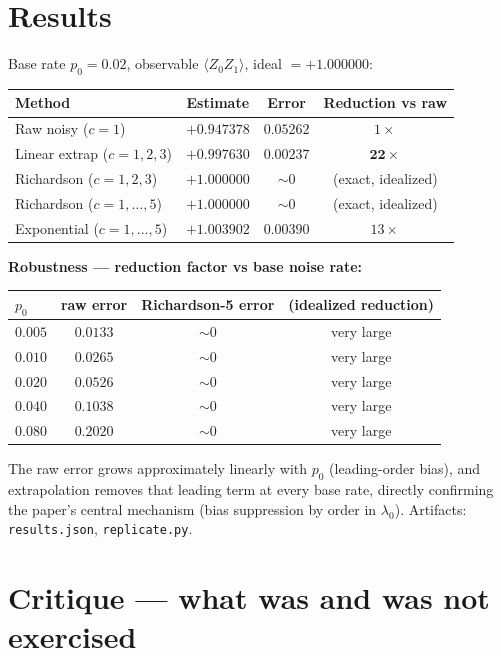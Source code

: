 \documentclass[11pt]{article}
\begin{document}
\section{Results}
Base rate $p_0 = 0.02$, observable $\langle Z_0 Z_1\rangle$, ideal $=+1.000000$:
\begin{center}
\begin{tabular}{@{}lccc@{}}
\toprule
Method & Estimate & Error & Reduction vs raw \\
\midrule
Raw noisy ($c{=}1$)             & $+0.947378$ & $0.05262$ & $1\times$ \\
Linear extrap ($c{=}1,2,3$)     & $+0.997630$ & $0.00237$ & $\mathbf{22\times}$ \\
Richardson ($c{=}1,2,3$)        & $+1.000000$ & ${\sim}0$ & (exact, idealized) \\
Richardson ($c{=}1,\dots,5$)    & $+1.000000$ & ${\sim}0$ & (exact, idealized) \\
Exponential ($c{=}1,\dots,5$)   & $+1.003902$ & $0.00390$ & $13\times$ \\
\bottomrule
\end{tabular}
\end{center}

\textbf{Robustness --- reduction factor vs base noise rate:}
\begin{center}
\begin{tabular}{@{}lccc@{}}
\toprule
$p_0$  & raw error & Richardson-5 error & (idealized reduction) \\
\midrule
$0.005$ & $0.0133$ & ${\sim}0$ & very large \\
$0.010$ & $0.0265$ & ${\sim}0$ & very large \\
$0.020$ & $0.0526$ & ${\sim}0$ & very large \\
$0.040$ & $0.1038$ & ${\sim}0$ & very large \\
$0.080$ & $0.2020$ & ${\sim}0$ & very large \\
\bottomrule
\end{tabular}
\end{center}
The raw error grows approximately linearly with $p_0$ (leading-order bias),
and extrapolation removes that leading term at every base rate, directly
confirming the paper's central mechanism (bias suppression by order in
$\lambda_0$). Artifacts: \texttt{results.json}, \texttt{replicate.py}.

\section{Critique --- what was and was not exercised}
\end{document}
